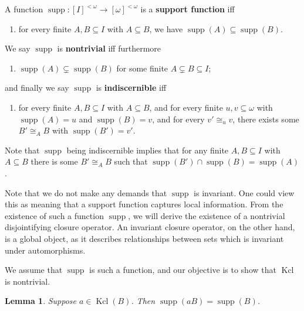 \documentclass[12pt]{amsart}
\theoremstyle{plain}
\newtheorem{lemma}[theorem]{Lemma}
\theoremstyle{definition}
\newcommand{\isom}{\cong}
\DeclareMathOperator{\supp}{supp}
\DeclareMathOperator{\clmin}{Kcl}
\begin{document}
A function $\supp : [I]^{<\omega} \rightarrow [\omega]^{<\omega}$ is a \textbf{support function} iff
\begin{enumerate}
    \item[(1)] for every finite $A, B \subseteq I$ with $A \subseteq B$, we have $\supp(A) \subseteq \supp(B)$.
\end{enumerate}
We say $\supp$ is \textbf{nontrivial} iff furthermore
\begin{enumerate}
    \item[(2)] $\supp(A) \subsetneq \supp(B)$ for some finite $A \subsetneq B \subseteq I$;
\end{enumerate}
and finally we say $\supp$ is \textbf{indiscernible} iff
\begin{enumerate}
    \item[(3)] for every finite $A, B \subseteq I$ with $A \subseteq B$, and for every finite $u, v \subseteq \omega$ with $\supp(A) = u$ and $\supp(B) = v$, and for every $v' \isom_u v$, there exists some $B' \isom_A B$ with $\supp(B') = v'$.
\end{enumerate}

Note that $\supp$ being indiscernible implies that for any finite $A, B \subseteq I$ with $A \subseteq B$ there is some $B' \isom_A B$ such that $\supp(B') \cap \supp(B) = \supp(A)$.


Note that we do not make any demands that $\supp$ is invariant.
One could view this as meaning that a support function captures local information.
From the existence of such a function $\supp$, we will derive the existence of a nontrivial disjointifying closure operator.
An invariant closure operator, on the other hand, is a global object, as it describes relationships between sets which is invariant under automorphisms.

We assume that $\supp$ is such a function, and our objective is to show that $\clmin$ is nontrivial.

\begin{lemma}\label{lem:clmin_implies_supp}
Suppose $a \in \clmin(B)$. Then $\supp(aB) = \supp(B)$.
\end{lemma}
\end{document}
